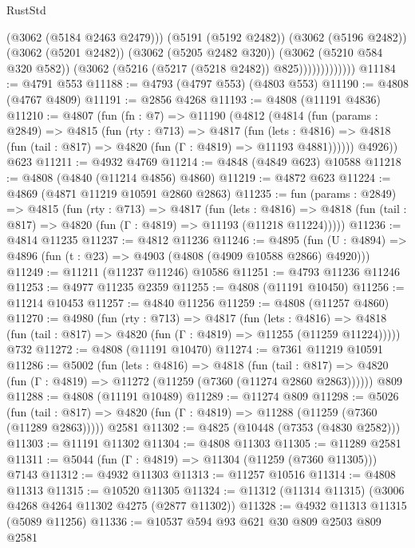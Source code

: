 \begin{lexlean}{RustStd}
\begin{coremodule}
                            (@3062 (@5184 @2463 @2479)))
                          (@5191 (@5192 @2482))
                          (@3062 (@5196 @2482))
                          (@3062 (@5201 @2482))
                          (@3062 (@5205 @2482 @320))
                          (@3062 (@5210 @584 @320 @582))
                          (@3062 (@5216 (@5217 (@5218 @2482)) @825)))))))))))))
@11184 := @4791 @553
@11188 := @4793 (@4797 @553) (@4803 @553)
@11190 := @4808 (@4767 @4809)
@11191 := @2856 @4268
@11193 := @4808 (@11191 @4836)
@11210 := @4807
    (fun (fn : @7) =>
    @11190
      (@4812
        (@4814
          (fun (params : @2849) =>
          @4815
            (fun (rty : @713) =>
            @4817
              (fun (lets : @4816) =>
              @4818 (fun (tail : @817) => @4820 (fun (Γ : @4819) => @11193 @4881))))))
        @4926))
    @623
@11211 := @4932 @4769
@11214 := @4848 (@4849 @623) @10588
@11218 := @4808 (@4840 (@11214 @4856) @4860)
@11219 := @4872 @623
@11224 := @4869 (@4871 @11219 @10591 @2860 @2863)
@11235 := fun (params : @2849) =>
  @4815
    (fun (rty : @713) =>
    @4817
      (fun (lets : @4816) =>
      @4818 (fun (tail : @817) => @4820 (fun (Γ : @4819) => @11193 (@11218 @11224)))))
@11236 := @4814 @11235
@11237 := @4812 @11236
@11246 := @4895
    (fun (U : @4894) => @4896 (fun (t : @23) => @4903 (@4808 (@4909 @10588 @2866) @4920)))
@11249 := @11211 (@11237 @11246) @10586
@11251 := @4793 @11236 @11246
@11253 := @4977 @11235 @2359
@11255 := @4808 (@11191 @10450)
@11256 := @11214 @10453
@11257 := @4840 @11256
@11259 := @4808 (@11257 @4860)
@11270 := @4980
    (fun (rty : @713) =>
    @4817
      (fun (lets : @4816) =>
      @4818 (fun (tail : @817) => @4820 (fun (Γ : @4819) => @11255 (@11259 @11224)))))
    @732
@11272 := @4808 (@11191 @10470)
@11274 := @7361 @11219 @10591
@11286 := @5002
    (fun (lets : @4816) =>
    @4818
      (fun (tail : @817) =>
      @4820 (fun (Γ : @4819) => @11272 (@11259 (@7360 (@11274 @2860 @2863))))))
    @809
@11288 := @4808 (@11191 @10489)
@11289 := @11274 @809
@11298 := @5026
    (fun (tail : @817) => @4820 (fun (Γ : @4819) => @11288 (@11259 (@7360 (@11289 @2863)))))
    @2581
@11302 := @4825 (@10448 (@7353 (@4830 @2582)))
@11303 := @11191 @11302
@11304 := @4808 @11303
@11305 := @11289 @2581
@11311 := @5044 (fun (Γ : @4819) => @11304 (@11259 (@7360 @11305))) @7143
@11312 := @4932 @11303
@11313 := @11257 @10516
@11314 := @4808 @11313
@11315 := @10520 @11305
@11324 := @11312 (@11314 @11315) (@3006 @4268 @4264 @11302 @4275 (@2877 @11302))
@11328 := @4932 @11313 @11315 (@5089 @11256)
@11336 := @10537 @594 @93 @621 @30 @809 @2503 @809 @2581

\end{coremodule}
\end{lexlean}

